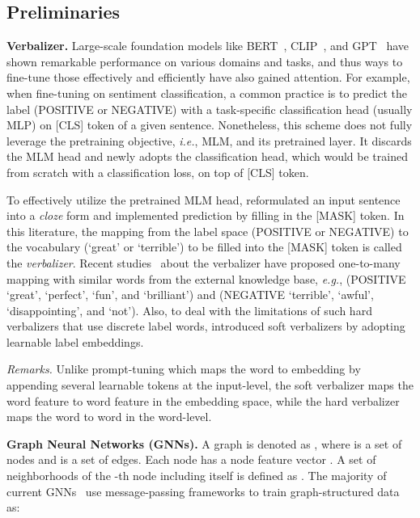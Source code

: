 \documentclass[10pt,twocolumn,letterpaper]{article}
\begin{document}
\subsection{Preliminaries}
\label{subsec:preliminaries}

\noindent \textbf{Verbalizer.}
Large-scale foundation models like BERT~\cite{devlin2018bert}, CLIP~\cite{radford2021learning}, and GPT~\cite{brown2020language} have shown remarkable performance on various domains and tasks, and thus ways to fine-tune those effectively and efficiently have also gained attention.
For example, when fine-tuning on sentiment classification, a common practice is to predict the label (POSITIVE or NEGATIVE) with a task-specific classification head (usually MLP) on [CLS] token of a given sentence.
Nonetheless, this scheme does not fully leverage the pretraining objective, \textit{i.e.}, MLM, and its pretrained layer. 
It discards the MLM head and newly adopts the classification head, which would be trained from scratch with a classification loss, on top of [CLS] token.

To effectively utilize the pretrained MLM head, \cite{schick2021exploiting} reformulated an input sentence into a \textit{cloze} form and implemented prediction by filling in the [MASK] token.
In this literature, the mapping from the label space (POSITIVE or NEGATIVE) to the vocabulary (`great' or `terrible') to be filled into the [MASK] token is called the \textit{verbalizer}.
Recent studies~\cite{hu2022knowledgeable,wang2022automatic} about the verbalizer have proposed one-to-many mapping with similar words from the external knowledge base, \textit{e.g.}, (POSITIVE  `great', `perfect', `fun', and `brilliant') and (NEGATIVE  `terrible', `awful', `disappointing', and `not').
Also, to deal with the limitations of such hard verbalizers that use discrete label words, \cite{cui2022prototypical, hambardzumyan2021warp, zhang2021differentiable} introduced soft verbalizers by adopting learnable label embeddings.

\noindent \textit{Remarks.}
Unlike prompt-tuning which maps the word to embedding by appending several learnable tokens at the input-level, the soft verbalizer maps the word feature to word feature in the embedding space, while the hard verbalizer maps the word to word in the word-level.

\noindent \textbf{Graph Neural Networks (GNNs).}
A graph is denoted as , where  is a set of nodes and  is a set of edges.
Each node  has a node feature vector .
A set of neighborhoods of the -th node including itself is defined as .
The majority of current GNNs~\cite{gilmer2017neural,kipf2016semi} use message-passing frameworks to train graph-structured data as:
\end{document}
